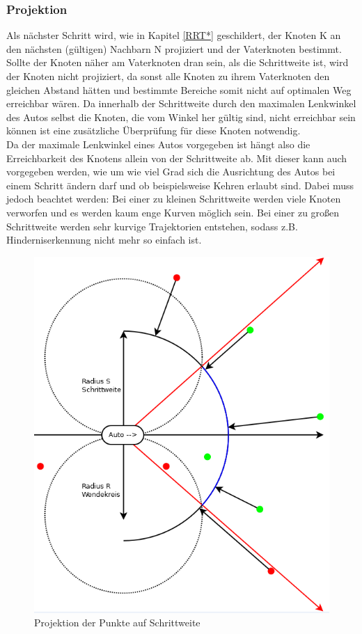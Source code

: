 \subsubsection{Projektion}
Als nächster Schritt wird, wie in Kapitel \ref{RRT*} geschildert, der Knoten K an den nächsten (gültigen) Nachbarn N projiziert und der Vaterknoten bestimmt. Sollte der Knoten näher am Vaterknoten dran sein, als die Schrittweite ist, wird der Knoten nicht projiziert, da sonst alle Knoten zu ihrem Vaterknoten den gleichen Abstand hätten und bestimmte Bereiche somit nicht auf optimalen Weg erreichbar wären. Da innerhalb der Schrittweite durch den maximalen Lenkwinkel des Autos selbst die Knoten, die vom Winkel her gültig sind, nicht erreichbar sein können ist eine zusätzliche Überprüfung für diese Knoten notwendig. \\
Da der maximale Lenkwinkel eines Autos vorgegeben ist hängt also die Erreichbarkeit des Knotens allein von der Schrittweite ab. Mit dieser kann auch vorgegeben werden, wie um wie viel Grad sich die Ausrichtung des Autos bei einem Schritt ändern darf und ob beispielsweise Kehren erlaubt sind. Dabei muss jedoch beachtet werden: Bei einer zu kleinen Schrittweite werden viele Knoten verworfen und es werden kaum enge Kurven möglich sein. Bei einer zu großen Schrittweite werden sehr kurvige Trajektorien entstehen, sodass z.B. Hinderniserkennung nicht mehr so einfach ist.
\begin{figure}
\centering
\label{fig:fig5}
\includegraphics[scale=0.7]{Bilder/Projektion_der_Punkte.png} 
\caption{Projektion der Punkte auf Schrittweite}
\end{figure}
